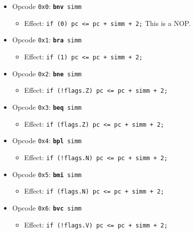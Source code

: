 \documentclass{article}
\begin{document}
	\singlespacing
	\begin{itemize}
		\item Opcode \texttt{0x0}:
			\texttt{\textbf{bnv} simm}
		\begin{itemize}
			\item Effect:
				\texttt{if (0) pc <= pc + simm + 2;} This is a NOP.
		\end{itemize}

		\item Opcode \texttt{0x1}:
			\texttt{\textbf{bra} simm}
		\begin{itemize}
			\item Effect:
				\texttt{if (1) pc <= pc + simm + 2;}
		\end{itemize}

		\item Opcode \texttt{0x2}:
			\texttt{\textbf{bne} simm}
		\begin{itemize}
			\item Effect:
				\texttt{if (!flags.Z) pc <= pc + simm + 2;}
		\end{itemize}

		\item Opcode \texttt{0x3}:
			\texttt{\textbf{beq} simm}
		\begin{itemize}
			\item Effect:
				\texttt{if (flags.Z) pc <= pc + simm + 2;}
		\end{itemize}

		\item Opcode \texttt{0x4}:
			\texttt{\textbf{bpl} simm}
		\begin{itemize}
			\item Effect:
				\texttt{if (!flags.N) pc <= pc + simm + 2;}
		\end{itemize}

		\item Opcode \texttt{0x5}:
			\texttt{\textbf{bmi} simm}
		\begin{itemize}
			\item Effect:
				\texttt{if (flags.N) pc <= pc + simm + 2;}
		\end{itemize}

		\item Opcode \texttt{0x6}:
			\texttt{\textbf{bvc} simm}
		\begin{itemize}
			\item Effect:
				\texttt{if (!flags.V) pc <= pc + simm + 2;}
		\end{itemize}


\end{itemize}
\end{document}
